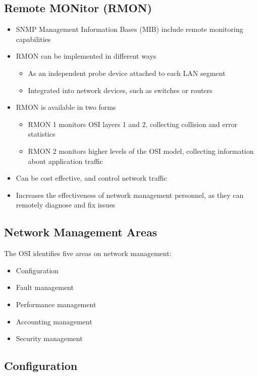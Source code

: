 \subsection*{Remote MONitor (RMON)}

\begin{itemize}
  \item SNMP Management Information Bases (MIB) include remote monitoring capabilities
  \item RMON can be implemented in different ways
  \begin{itemize}
    \item As an independent probe device attached to each LAN segment
    \item Integrated into network devices, such as switches or routers
  \end{itemize}
  \item RMON is available in two forms
  \begin{itemize}
    \item RMON 1 monitors OSI layers 1 and 2, collecting collision and error statistics
    \item RMON 2 monitors higher levels of the OSI model, collecting information about application traffic
  \end{itemize}
  \item Can be cost effective, and control network traffic
  \item Increases the effectiveness of network management personnel, as they can remotely diagnose and fix issues
\end{itemize}

\subsection*{Network Management Areas}

The OSI identifies five areas on network management:
\begin{itemize}
  \item Configuration
  \item Fault management
  \item Performance management
  \item Accounting management
  \item Security management
\end{itemize}

\subsection*{Configuration}

